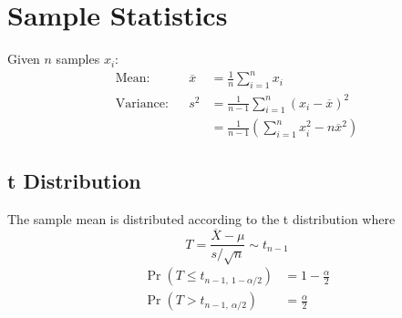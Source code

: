 \documentclass{article}
\begin{document}
\begin{minipage}{62.39259259mm}
    \section*{Sample Statistics}
    Given $n$ samples $x_i$:
    \begin{align*}
        \text{Mean:}     &  & \overline{x} & = \frac{1}{n}\sum_{i=1}^{n} x_i                                      \\
        \text{Variance:} &  & s^2          & = \frac{1}{n-1}\sum_{i=1}^{n} \left( x_i - \overline{x} \right)^2    \\
                         &  &              & = \frac{1}{n-1}\left( \sum_{i=1}^{n} x_i^2 - n\overline{x}^2 \right)
    \end{align*}
    \subsection*{t Distribution}
    The sample mean is distributed according to the t distribution where
    \begin{equation*}
        T=\frac{\overline{X} - \mu}{s/\sqrt{n}}\sim t_{n-1}
    \end{equation*}
    \begin{align*}
        \Pr{\left( T \leq t_{n-1,\: 1-\alpha/2} \right)} & = 1 - \frac{\alpha}{2} \\
        \Pr{\left( T > t_{n-1,\: \alpha/2} \right)}      & = \frac{\alpha}{2}
    \end{align*}
\end{minipage}\hfill%
\end{document}
